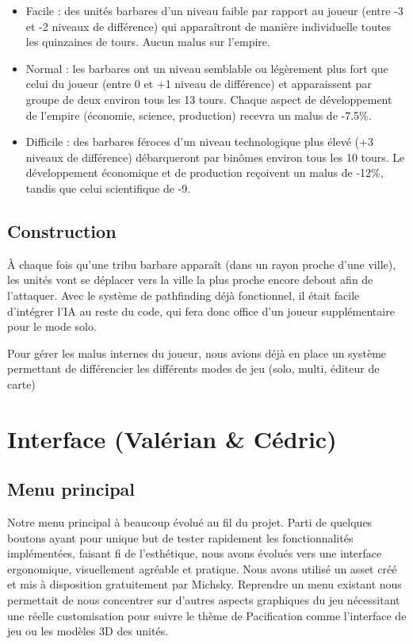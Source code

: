 \documentclass[12pt]{report}
\begin{document}
\begin{itemize}
    \item Facile : des unités barbares d'un niveau faible par rapport au joueur
        (entre -3 et -2 niveaux de différence) qui apparaîtront de manière
        individuelle toutes les quinzaines de tours. Aucun malus sur l'empire.
    \item Normal : les barbares ont un niveau semblable ou légèrement plus fort
        que celui du joueur (entre 0 et +1 niveau de différence) et apparaissent
        par groupe de deux environ tous les 13 tours. Chaque aspect de
        développement de l'empire (économie, science, production) recevra un
        malus de -7.5\%.
    \item Difficile : des barbares féroces d'un niveau technologique plus élevé
        (+3 niveaux de différence) débarqueront par binômes environ tous les 10
        tours. Le développement économique et de production reçoivent un malus
        de -12\%, tandis que celui scientifique de -9.
\end{itemize}

\subsection{Construction}

À chaque fois qu’une tribu barbare apparaît (dans un rayon proche d’une ville),
les unités vont se déplacer vers la ville la plus proche encore debout afin de
l’attaquer. Avec le système de pathfinding déjà fonctionnel, il était facile
d’intégrer l’IA au reste du code, qui fera donc office d’un joueur
supplémentaire pour le mode solo.

Pour gérer les malus internes du joueur, nous avions déjà en place un système
permettant de différencier les différents modes de jeu (solo, multi, éditeur de
carte)

\section{Interface (Valérian \& Cédric)}

\subsection{Menu principal}

Notre menu principal à beaucoup évolué au fil du projet. Parti de quelques
boutons ayant pour unique but de tester rapidement les fonctionnalités
implémentées, faisant fi de l’esthétique, nous avons évolués vers une interface
ergonomique, visuellement agréable et pratique. Nous avons utilisé un asset créé
et mis à disposition gratuitement par Michsky. Reprendre un menu existant nous
permettait de nous concentrer sur d’autres aspects graphiques du jeu nécessitant
une réelle customisation pour suivre le thème de Pacification comme l’interface
de jeu ou les modèles 3D des unités.
\end{document}

